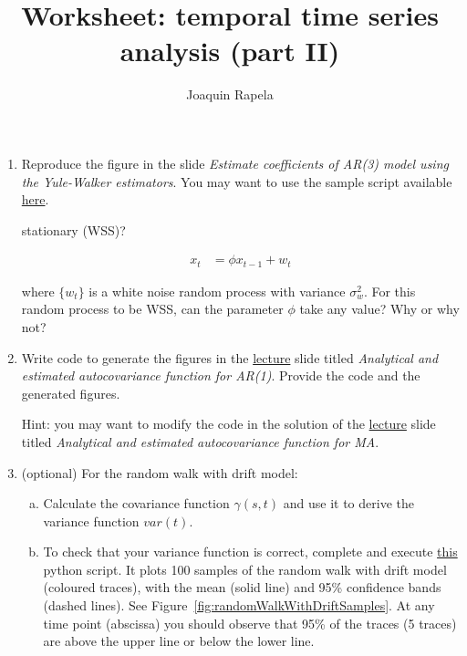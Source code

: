 \documentclass[12pt]{article}
\title{Worksheet: temporal time series analysis (part II)}
\author{Joaquin Rapela}
\begin{document}
\maketitle

\begin{enumerate}

    \item Reproduce the figure in the slide \emph{Estimate coefficients of
        AR(3) model using the Yule-Walker estimators}. You may want to use the
        sample script available \href{}{here}.

        stationary (WSS)?

        \begin{align}
            x_t & = \phi x_{t-1} + w_t\label{eq:randomProcess}
        \end{align}

        where $\{w_t\}$ is a white noise random process with variance
        $\sigma^2_w$. For this random process to be WSS, can the parameter
        $\phi$ take any value? Why or why not?

    \item Write code to generate the figures in the
        \href{https://github.com/joacorapela/statNeuro2025/blob/master/lectures/01_temporalTimeSeriesAnalysis/temporalTimeSeriesAnalysis.pdf}{lecture}
        slide titled \emph{Analytical and estimated autocovariance function for
        AR(1)}. Provide the code and the generated figures.

        Hint: you may want to modify the code in the solution of the
        \href{https://github.com/joacorapela/statNeuro2025/blob/master/lectures/01_temporalTimeSeriesAnalysis/temporalTimeSeriesAnalysis.pdf}{lecture}
        slide titled \emph{Analytical and estimated autocovariance function for MA}.

    \item (optional) For the random walk with drift model:

        \begin{enumerate}[(a)]

            \item Calculate the covariance function $\gamma(s, t)$ and use it
                to derive the variance function $var(t)$.

            \item To check that your variance function is correct, complete and
                execute
                \href{https://github.com/joacorapela/statNeuro2025/blob/master/worksheets/01_temporalTimeSeriesAnalysis/plot_samplesRandomWalkWithDrift.py}{this}
                python script. It plots 100 samples of the random walk with
                drift model (coloured traces), with the mean (solid line) and
                95\% confidence bands (dashed lines). See
                Figure~\ref{fig:randomWalkWithDriftSamples}. At any time point
                (abscissa) you should observe that 95\% of the traces (5
                traces) are above the upper line or below the lower line.



\end{enumerate}
\end{enumerate}
\end{document}
